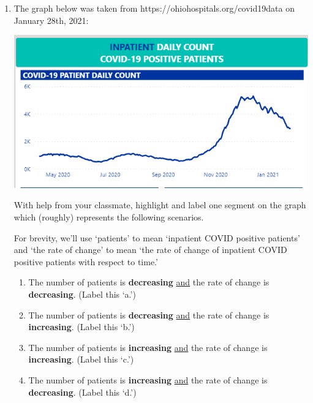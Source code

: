 \documentclass{ximera}
\begin{document}
\begin{enumerate}
\newpage

\item  The graph below was taken from https://ohiohospitals.org/covid19data on January 28th, 2021:

\bigskip

\centerline{\includegraphics[width = 5in]{./AppDerivativesGraphics/COVIDPatients.PNG}}

\bigskip


With help from your classmate, highlight and label one segment on the graph which (roughly) represents the following scenarios.

\smallskip

For brevity, we'll use `patients' to mean `inpatient COVID positive patients' and `the rate of change' to mean `the rate of change of inpatient COVID positive patients with respect to time.'

\smallskip

\begin{enumerate}

\item  The number of patients is \textbf{decreasing}  \underline{and}  the rate of change is \textbf{decreasing}.  (Label this `a.')

\smallskip

\item  The number of patients is \textbf{decreasing}  \underline{and}  the rate of change  is \textbf{increasing}.  (Label this `b.')

\smallskip


\item  The number of patients is \textbf{increasing}  \underline{and}  the rate of change  is \textbf{increasing}.  (Label this `c.')

\smallskip


\item  The number of patients is \textbf{increasing}  \underline{and}  the rate of change is \textbf{decreasing}.  (Label this `d.')


\end{enumerate}
\end{enumerate}
\end{document}
